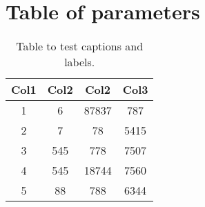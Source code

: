 \section{Table of parameters}\label{app:table_of_parameters}

\begin{table}[h!]
\centering
\begin{tabular}{c c c c}
 \toprule
 Col1 & Col2 & Col2 & Col3 \\ [0.5ex] 
 \midrule
 1 & 6 & 87837 & 787 \\ 
 
 2 & 7 & 78 & 5415 \\
 
 3 & 545 & 778 & 7507 \\
 
 4 & 545 & 18744 & 7560 \\
 
 5 & 88 & 788 & 6344 \\ [1ex] 
 \bottomrule
\end{tabular}
\caption{Table to test captions and labels.} \label{ta}
\label{tab:parameters}
\end{table}